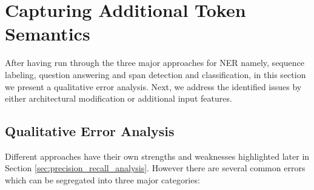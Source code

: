 \section{Capturing Additional Token Semantics}
\label{sec:additional_token_semantics}
After having run through the three major approaches for NER namely, sequence labeling, question answering and span detection and classification, in this section we present a qualitative error analysis. Next, we address the identified issues by either architectural modification or additional input features.

\subsection{Qualitative Error Analysis}
Different approaches have their own strengths and weaknesses highlighted later in Section \ref{sec:precision_recall_analysis}. However there are several common errors which can be segregated into three major categories:

